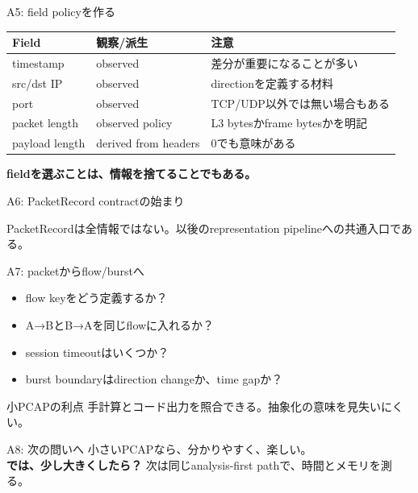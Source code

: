 \documentclass[aspectratio=169,11pt]{beamer}
\begin{document}
\begin{frame}{A5: field policyを作る}
\small
\begin{tabular}{p{}p{}p{}}
\toprule
Field & 観察/派生 & 注意 \\
\midrule
timestamp & observed & 差分が重要になることが多い \\
src/dst IP & observed & directionを定義する材料 \\
port & observed & TCP/UDP以外では無い場合もある \\
packet length & observed policy & L3 bytesかframe bytesかを明記 \\
payload length & derived from headers & 0でも意味がある \\
\bottomrule
\end{tabular}
\vfill
\centering\textbf{fieldを選ぶことは、情報を捨てることでもある。}
\end{frame}
\begin{frame}{A6: PacketRecord contractの始まり}
\centering
{}
\vfill
PacketRecordは全情報ではない。以後のrepresentation pipelineへの共通入口である。
\end{frame}
\begin{frame}{A7: packetからflow/burstへ}
\begin{itemize}
\item flow keyをどう定義するか？
\item A→BとB→Aを同じflowに入れるか？
\item session timeoutはいくつか？
\item burst boundaryはdirection changeか、time gapか？
\end{itemize}
\vfill
\begin{block}{小PCAPの利点}
手計算とコード出力を照合できる。抽象化の意味を見失いにくい。
\end{block}
\end{frame}
\begin{frame}{A8: 次の問いへ}
\centering
\Large 小さいPCAPなら、分かりやすく、楽しい。\\[1em]
\textbf{では、少し大きくしたら？}
\vfill
\normalsize
次は同じanalysis-first pathで、時間とメモリを測る。
\end{frame}
\end{document}

